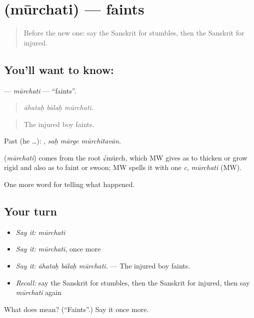 \section[\texorpdfstring{\sk{मूर्छति} (mūrchati)}{मूर्छति (mūrchati)}]{ (mūrchati) — faints}

\label{lesson:SA-C294-murchati}



\begin{quote}
Before the new one: say the Sanskrit for stumbles, then the Sanskrit for injured.
\end{quote}

\subsection*{You'll want to know: }
\textbf{} — \emph{mūrchati} — \textquotedblleft{}faints\textquotedblright{}.

\begin{quote}
  
\end{quote}

\begin{quote}
\emph{āhataḥ bālaḥ mūrchati.}
\end{quote}

\begin{quote}
The injured boy faints.
\end{quote}

Past (he …):   , \emph{saḥ mārge mūrchitavān}.

\begin{cousinweb}
\textbf{} (\emph{mūrchati}) comes from the root √mūrch, which MW gives as to thicken or grow rigid and also as to faint or swoon; MW spells it with one \emph{c}, \emph{mūrchati} (MW).
\end{cousinweb}

\begin{grammarlens}[title={What you've built}]
One more word for telling what happened.
\end{grammarlens}

\subsection*{Your turn}
\begin{itemize}
\raggedright
  \item \emph{Say it:} \emph{mūrchati}
  \item \emph{Say it:} \emph{mūrchati}, once more
  \item \emph{Say it:} \emph{āhataḥ bālaḥ mūrchati.} — The injured boy faints.
  \item \emph{Recall:} say the Sanskrit for stumbles, then the Sanskrit for injured, then say \emph{mūrchati} again
\end{itemize}

\begin{tcolorbox}[breakable,colback=teal!4,colframe=teal!35!black,title={Before you move on}]
What does  mean? (\textquotedblleft{}Faints\textquotedblright{}.) Say it once more.
\end{tcolorbox}
